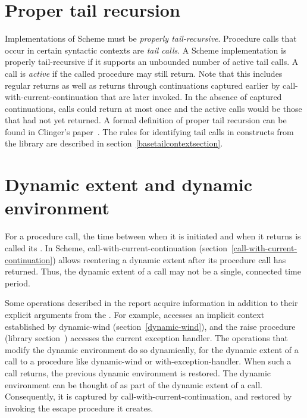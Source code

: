 \section{Proper tail recursion}
\label{proper tail recursion}

Implementations of Scheme must be
{\em properly tail-recursive}.
Procedure calls that occur in certain syntactic
contexts are \textit{tail calls}.  A Scheme implementation is
properly tail-recursive if it supports an unbounded number of active
tail calls.  A call is {\em active} if the called procedure may still
return.  Note that this includes regular returns as well as returns
through continuations captured earlier by
{\cf call-with-current-continuation} that are later invoked.
In the absence of captured continuations, calls could
return at most once and the active calls would be those that had not
yet returned.
A formal definition of proper tail recursion can be found
in Clinger's paper~\cite{propertailrecursion}.  The rules for identifying tail calls
in constructs from the  library are described in
section~\ref{basetailcontextsection}.

\section{Dynamic extent and dynamic environment}
\label{dynamicenvironmentsection}

For a procedure call, the time between when it is initiated and when
it returns is called its .  In Scheme, {\cf
  call-with-current-continuation}
(section~\ref{call-with-current-continuation}) allows reentering a
dynamic extent after its procedure call has returned.  Thus, the
dynamic extent of a call may not be a single, connected time period.

Some operations described in the report acquire information in
addition to their explicit arguments from the .  For example, accesses an implicit context established
by {\cf dynamic-wind} (section~\ref{dynamic-wind}), and the {\cf
  raise} procedure (library
section~) accesses the
current exception handler.  The operations that modify the dynamic
environment do so dynamically, for the dynamic extent of a call to a
procedure like {\cf dynamic-wind} or {\cf with-exception-handler}.
When such a call returns, the previous dynamic environment is
restored.  The dynamic environment can be thought of as part of the
dynamic extent of a call.  Consequently, it is captured by {\cf
  call-with-current-continuation}, and restored by invoking the escape
procedure it creates.

